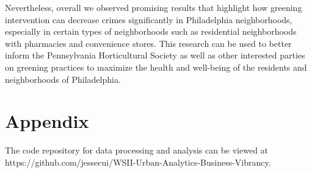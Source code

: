 \documentclass{article}
\begin{document}
Nevertheless, overall we observed promising results that highlight how greening intervention can decrease crimes significantly in Philadelphia neighborhoods, especially in certain types of neighborhoods such as residential neighborhoods with pharmacies and convenience stores. This research can be used to better inform the Pennsylvania Horticultural Society as well as other interested parties on greening practices to maximize the health and well-being of the residents and neighborhoods of Philadelphia.

\newpage
  

\newpage
\section{Appendix}
The code repository for data processing and analysis can be viewed at https://github.com/jessecui/WSII-Urban-Analytics-Business-Vibrancy.
\end{document}
